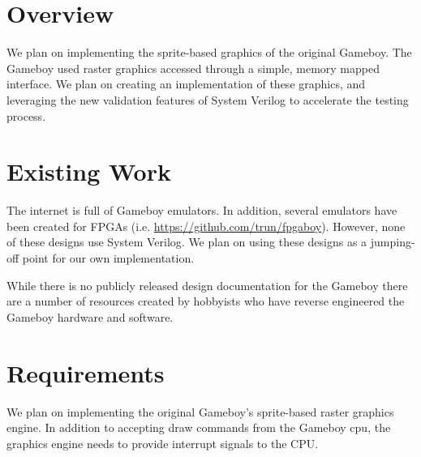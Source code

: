\documentclass{article}
\begin{document}
\newenvironment{frcseries}{\fontfamily{frc}\selectfont}{}
\newcommand{\textfrc}[1]{{\frcseries#1}}
\newcommand{\mathfrc}[1]{\text{\textfrc{#1}}}




\section{Overview}
We plan on implementing the sprite-based graphics of the original
Gameboy. The Gameboy used raster graphics accessed through a simple,
memory mapped interface. We plan on creating an implementation of these
graphics, and leveraging the new validation features of System Verilog
to accelerate the testing process. 

\section{Existing Work}
The internet is full of Gameboy emulators. In addition, several
emulators have been created for FPGAs (i.e.
\url{https://github.com/trun/fpgaboy}). However, none of these designs
use System Verilog. We plan on using these designs as a jumping-off
point for our own implementation.

While there is no publicly released design documentation for the 
Gameboy there are a number of resources created by hobbyists who 
have reverse engineered the Gameboy hardware and software.

\section{Requirements}

We plan on implementing the original Gameboy's sprite-based raster
graphics engine. In addition to accepting draw commands from the
Gameboy cpu, the graphics engine needs to provide interrupt signals to
the CPU. 
\end{document}
